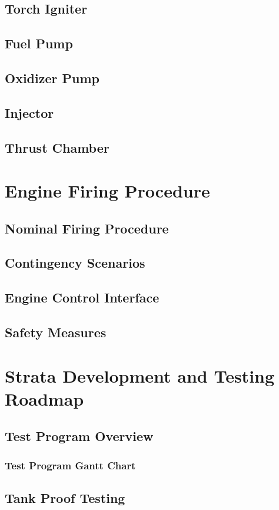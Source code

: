 \documentclass[12pt, letterpaper]{article}
\begin{document}
\subsection{Torch Igniter}
\subsection{Fuel Pump}
\subsection{Oxidizer Pump}
\subsection{Injector}
\subsection{Thrust Chamber}

\section{Engine Firing Procedure}
\subsection{Nominal Firing Procedure}
\subsection{Contingency Scenarios}
\subsection{Engine Control Interface}
\subsection{Safety Measures}

\section{Strata Development and Testing Roadmap}
\subsection{Test Program Overview}
\subsubsection{Test Program Gantt Chart}
\subsection{Tank Proof Testing}
\end{document}
